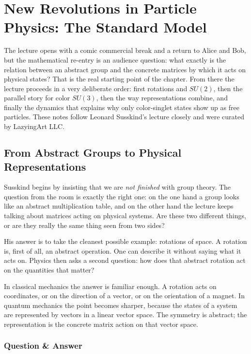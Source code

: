 \chapter{New Revolutions in Particle Physics: The Standard Model}

The lecture opens with a comic commercial break and a return to Alice and Bob, but the mathematical re-entry is an audience question: what exactly is the relation between an abstract group and the concrete matrices by which it acts on physical states? That is the real starting point of the chapter. From there the lecture proceeds in a very deliberate order: first rotations and \(SU(2)\), then the parallel story for color \(SU(3)\), then the way representations combine, and finally the dynamics that explains why only color-singlet states show up as free particles. These notes follow Leonard Susskind's lecture closely and were curated by LazyingArt LLC.

\section{From Abstract Groups to Physical Representations}

Susskind begins by insisting that we are \emph{not finished} with group theory. The question from the room is exactly the right one: on the one hand a group looks like an abstract multiplication table, and on the other hand the lecture keeps talking about matrices acting on physical systems. Are these two different things, or are they really the same thing seen from two sides?

His answer is to take the cleanest possible example: rotations of space. A rotation is, first of all, an abstract operation. One can describe it without saying what it acts on. Physics then asks a second question: how does that abstract rotation act on the quantities that matter?

In classical mechanics the answer is familiar enough. A rotation acts on coordinates, or on the direction of a vector, or on the orientation of a magnet. In quantum mechanics the point becomes sharper, because the states of a system are represented by vectors in a linear vector space. The symmetry is abstract; the representation is the concrete matrix action on that vector space.

\subsection{Question \& Answer}

